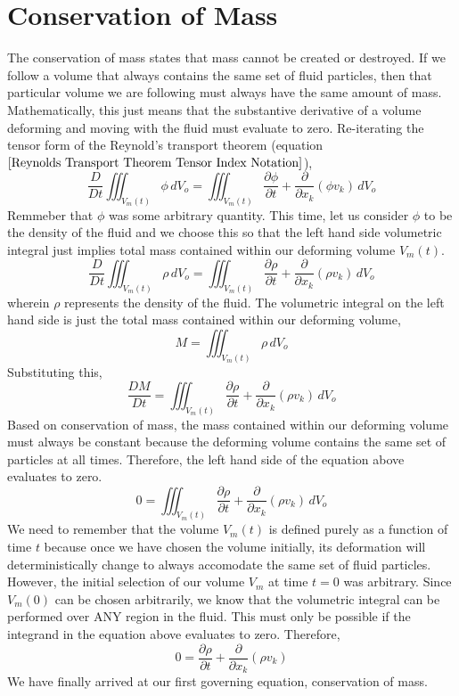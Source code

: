 \section{Conservation of Mass}
\begin{comment}
\end{comment}
The conservation of mass states that mass cannot be created or destroyed.
If we follow a volume that always contains the same set of fluid particles, then that particular volume we are following must always have the same amount of mass.
Mathematically, this just means that the substantive derivative of a volume deforming and moving with the fluid must evaluate to zero.
Re-iterating the tensor form of the Reynold's transport theorem (equation $\ref{Reynolds Transport Theorem Tensor Index Notation}$),
$$\frac{D}{Dt}\iiint^{}_{V_{m}(t)} \phi \,dV_{o} = \iiint^{}_{V_{m}(t)} \frac{\partial \phi}{\partial t} + \frac{\partial}{\partial x_{k}} (\phi v_{k}) \,dV_{o}$$
Remmeber that $\phi$ was some arbitrary quantity. 
This time, let us consider $\phi$ to be the density of the fluid and we choose this so that the left hand side volumetric integral just implies total mass contained within our deforming volume $V_{m}(t)$.
$$\frac{D}{Dt}\iiint^{}_{V_{m}(t)} \rho \,dV_{o} = \iiint^{}_{V_{m}(t)} \frac{\partial \rho}{\partial t} + \frac{\partial}{\partial x_{k}} (\rho v_{k}) \,dV_{o}$$
wherein $\rho$ represents the density of the fluid.
The volumetric integral on the left hand side is just the total mass contained within our deforming volume,
$$M = \iiint^{}_{V_{m}(t)} \rho \,dV_{o}$$
Substituting this,
$$\frac{DM}{Dt} = \iiint^{}_{V_{m}(t)} \frac{\partial \rho}{\partial t} + \frac{\partial}{\partial x_{k}} (\rho v_{k}) \,dV_{o}$$
Based on conservation of mass, the mass contained within our deforming volume must always be constant because the deforming volume contains the same set of particles at all times.
Therefore, the left hand side of the equation above evaluates to zero.
$$0 = \iiint^{}_{V_{m}(t)} \frac{\partial \rho}{\partial t} + \frac{\partial}{\partial x_{k}} (\rho v_{k}) \,dV_{o}$$
We need to remember that the volume $V_{m}(t)$ is defined purely as a function of time $t$ because once we have chosen the volume initially, its deformation will deterministically change to always accomodate the same set of fluid particles.
However, the initial selection of our volume $V_{m}$ at time $t = 0$ was arbitrary. 
Since $V_{m}(0)$ can be chosen arbitrarily, we know that the volumetric integral can be performed over ANY region in the fluid.
This must only be possible if the integrand in the equation above evaluates to zero.
Therefore,
\begin{equation}0 = \frac{\partial \rho}{\partial t} + \frac{\partial}{\partial x_{k}} (\rho v_{k}) \label{Governing Equation Fluid Conservation of Mass}\end{equation}
We have finally arrived at our first governing equation, conservation of mass.


